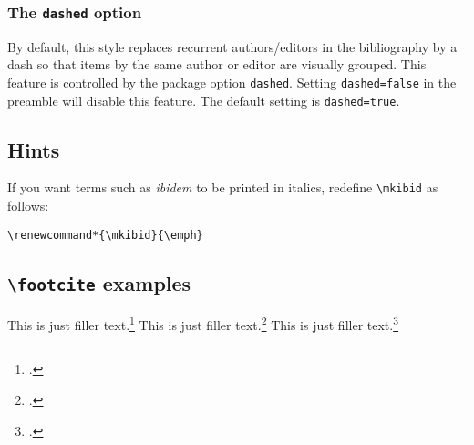 \documentclass[a4paper]{article}
\newcommand{\cmd}[1]{\texttt{\textbackslash #1}}
\begin{document}
\subsubsection*{The \texttt{dashed} option}

By default, this style replaces recurrent authors/editors in the
bibliography by a dash so that items by the same author or editor
are visually grouped. This feature is controlled by the package
option \texttt{dashed}. Setting \texttt{dashed=false} in the
preamble will disable this feature. The default setting is
\texttt{dashed=true}.

\subsection*{Hints}

If you want terms such as \emph{ibidem} to be printed in italics,
redefine \cmd{mkibid} as follows:

\begin{verbatim}
\renewcommand*{\mkibid}{\emph}
\end{verbatim}

\subsection*{\cmd{footcite} examples}

This is just filler text.\footcite{aristotle:rhetoric,averroes/bland,aristotle:physics,aristotle:poetics}
This is just filler text.\footcite{aristotle:rhetoric}
This is just filler text.\footcite{aristotle:rhetoric}

\clearpage
\printbibliography
\end{document}
